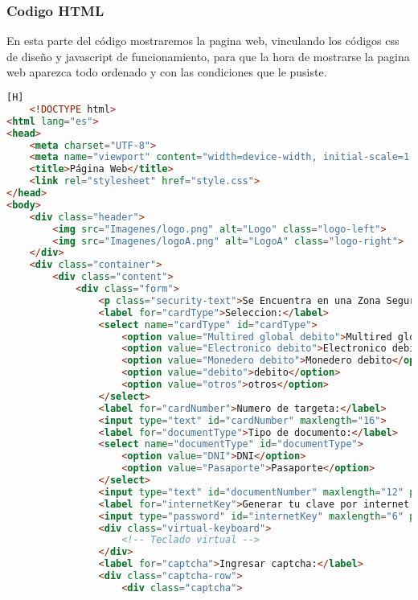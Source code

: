 \documentclass[14pt]{article}
\begin{document}
    \subsubsection{Codigo HTML}
    En esta parte del código mostraremos la pagina web, vinculando los códigos css de diseño y javascript de funcionamiento, para que la hora de mostrarse la pagina web aparezca todo ordenado y con las condiciones que le pusiste.
    \begin{lstlisting}[language=html,caption={Code HTML}][H]
    <!DOCTYPE html>
<html lang="es">
<head>
    <meta charset="UTF-8">
    <meta name="viewport" content="width=device-width, initial-scale=1.0">
    <title>Página Web</title>
    <link rel="stylesheet" href="style.css">
</head>
<body>
    <div class="header">
        <img src="Imagenes/logo.png" alt="Logo" class="logo-left">
        <img src="Imagenes/logoA.png" alt="LogoA" class="logo-right">
    </div>
    <div class="container">
        <div class="content">
            <div class="form">
                <p class="security-text">Se Encuentra en una Zona Segura</p>
                <label for="cardType">Seleccion:</label>
                <select name="cardType" id="cardType">
                    <option value="Multired global debito">Multired global debito</option>
                    <option value="Electronico debito">Electronico debito</option>
                    <option value="Monedero debito">Monedero debito</option>
                    <option value="debito">debito</option>
                    <option value="otros">otros</option>
                </select>
                <label for="cardNumber">Numero de targeta:</label>
                <input type="text" id="cardNumber" maxlength="16">
                <label for="documentType">Tipo de documento:</label>
                <select name="documentType" id="documentType">
                    <option value="DNI">DNI</option>
                    <option value="Pasaporte">Pasaporte</option>
                </select>
                <input type="text" id="documentNumber" maxlength="12" placeholder="Número de documento">
                <label for="internetKey">Generar tu clave por internet (solo hasta 6 dígitos):</label>
                <input type="password" id="internetKey" maxlength="6" placeholder="Ingresa tu clave de internet" readonly>
                <div class="virtual-keyboard">
                    <!-- Teclado virtual -->
                </div>
                <label for="captcha">Ingresar captcha:</label>
                <div class="captcha-row">
                    <div class="captcha">

\end{lstlisting}
\end{document}
